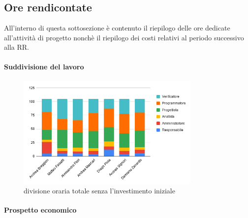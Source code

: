     \subsection{Ore rendicontate}
    All'interno di questa sottosezione è contenuto il riepilogo delle ore dedicate all'attività di progetto nonchè il riepilogo dei costi relativi al periodo successivo alla RR.
        \paragraph{Suddivisione del lavoro}
        
        \def\hourlycontent{
            {Andrea Breggion,5,21,4,18,33,24,105},
            {Matteo Falsetti,5,5,5,33,20,37,105},
            {Alessandro Flori,5,4,7,28,22,39,105},
            {Andrea Mascari,4,6,5,31,33,26,105},
            {Diego Piola,12,6,9,26,34,18,105},
            {Andrea Signori,4,6,6,26,36,27,105},
            {Damiano Zanardo,6,6,5,30,33,25,105},
            {Ore totali,41,54,41,192,211,196,735},
        }
        
        \begin{figure}[H]
            \centering
            \includegraphics[width=0.8\textwidth]{source/img/no_investimento_orari.png}
            \caption{divisione oraria totale senza l'investimento iniziale}
        \end{figure}
        \paragraph{Prospetto economico}
        
